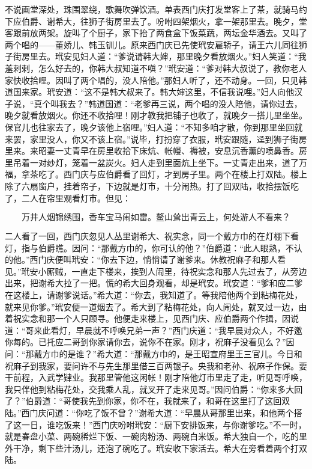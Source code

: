 不说画堂深处，珠围翠绕，歌舞吹弹饮酒。单表西门庆打发堂客上了茶，就骑马约下应伯爵、谢希大，往狮子街房里去了。吩咐四架烟火，拿一架那里去。晚夕，堂客跟前放两架。旋叫了个厨子，家下抬了两食盒下饭菜蔬，两坛金华酒去。又叫了两个唱的——董娇儿、韩玉钏儿。原来西门庆已先使玳安雇轿子，请王六儿同往狮子街房里去。玳安见妇人道：“爹说请韩大婶，那里晚夕看放烟火。”妇人笑道：“我羞剌剌，怎么好去的，你韩大叔知道不嗔？”玳安道：“爹对韩大叔说了，教你老人家快收拾哩。因叫了两个唱的，没人陪他。”那妇人听了，还不动身。一回，只见韩道国来家。玳安道：“这不是韩大叔来了。韩大婶这里，不信我说哩。”妇人向他汉子说，“真个叫我去？”韩道国道：“老爹再三说，两个唱的没人陪他，请你过去，晚夕就看放烟火。你还不收拾哩！刚才教我把铺子也收了，就晚夕一搭儿里坐坐。保官儿也往家去了，晚夕该他上宿哩。”妇人道：“不知多咱才散，你到那里坐回就来罢，家里没人，你又不该上宿。”说毕，打扮穿了衣服，玳安跟随，迳到狮子街房里来。来昭妻一丈青早在房里收拾下床炕、帐幔、褥被，安息沉香薰的喷鼻香。房里吊着一对纱灯，笼着一盆炭火。妇人走到里面炕上坐下。一丈青走出来，道了万福，拿茶吃了。西门庆与应伯爵看了回灯，才到房子里。两个在楼上打双陆。楼上除了六扇窗户，挂着帘子，下边就是灯市，十分闹热。打了回双陆，收拾摆饭吃了，二人在帘里观看灯市。但见：

\[
万井人烟锦绣围，香车宝马闹如雷。
鳌山耸出青云上，何处游人不看来？
\]

二人看了一回，西门庆忽见人丛里谢希大、祝实念，同一个戴方巾的在灯棚下看灯，指与伯爵瞧。因问：“那戴方巾的，你可认的他？”伯爵道：“此人眼熟，不认的他。”西门庆便叫玳安：“你去下边，悄悄请了谢爹来。休教祝麻子和那人看见。”玳安小厮贼，一直走下楼来，挨到人闹里，待祝实念和那人先过去了，从旁边出来，把谢希大拉了一把。慌的希大回身观看，却是玳安。玳安道：“爹和应二爹在这楼上，请谢爹说话。”希大道：“你去，我知道了。等我陪他两个到粘梅花处，就来见你爹。”玳安便一道烟去了。希大到了粘梅花处，向人闹处，就叉过一边，由着祝实念和那一个人只顾寻。他便走来楼上，见西门庆、应伯爵两个作揖，因说道：“哥来此看灯，早晨就不呼唤兄弟一声？”西门庆道：“我早晨对众人，不好邀你每的。已托应二哥到你家请你去，说你不在家。刚才，祝麻子没看见么？”因问：“那戴方巾的是谁？”希大道：“那戴方巾的，是王昭宣府里王三官儿。今日和祝麻子到我家，要问许不与先生那里借三百两银子。央我和老孙、祝麻子作保。要干前程，入武学肄业。我那里管他这闲帐！刚才陪他灯市里走了走，听见哥呼唤，我只伴他到粘梅花处，交我乘人乱，就叉开了走来见哥。”因问伯爵：“你来多大回了？”伯爵道：“哥使我先到你家，你不在，我就来了，和哥在这里打了这回双陆。”西门庆问道：“你吃了饭不曾？”谢希大道：“早晨从哥那里出来，和他两个搭了这一日，谁吃饭来！”西门庆吩咐玳安：“厨下安排饭来，与你谢爹吃。”不一时，就是春盘小菜、两碗稀烂下饭、一碗肉粉汤、两碗白米饭。希大独自一个，吃的里外干净，剩下些汁汤儿，还泡了碗吃了。玳安收下家活去。希大在旁看着两个打双陆。

